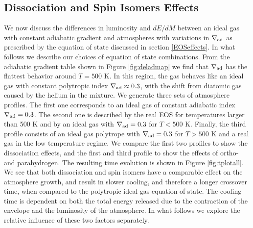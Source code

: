 \documentclass[apj]{emulateapj}
\newcommand{\delad}{\nabla_{\rm ad}}
\begin{document}


\subsection{Dissociation and Spin Isomers Effects}
\label{deladeffect}

We now discuss the differences in luminosity and $dE/dM$ between an ideal gas with constant adiabatic gradient and atmospheres with variations in $\delad$ as prescribed by the equation of state discussed in section \ref{EOSeffects}. In what follows we describe our choices of equation of state combinations. From the adiabatic gradient table shown in Figure \ref{fig:deladmap} we find that $\delad$ has the flattest behavior around $T=500$ K. In this region, the gas behaves like an ideal gas with constant polytropic index $\delad \approx 0.3$, with the shift from diatomic gas caused by the helium in the mixture. We generate three sets of atmosphere profiles. The first one corresponds to an ideal gas of constant adiabatic index $\delad=0.3$. The second one is described by the real EOS for temperatures larger than 500 K and by an ideal gas with $\delad=0.3$ for $T<500$ K. Finally, the third profile consists of an ideal gas polytrope with $\delad=0.3$ for $T>500$ K and a real gas in the low temperature regime. We compare the first two profiles to show the dissociation effects, and the first and third profile to show the effects of ortho- and parahydrogen. The resulting time evolution is shown in Figure \ref{fig:tplotall}. We see that both dissociation and spin isomers have a comparable effect on the atmosphere growth, and result in slower cooling, and therefore a longer crossover time, when compared to the polytropic ideal gas equation of state. The cooling time is dependent on both the total energy released due to the contraction of the envelope and the luminosity of the atmosphere. In what follows we explore the relative influence of these two factors separately.
\end{document}
